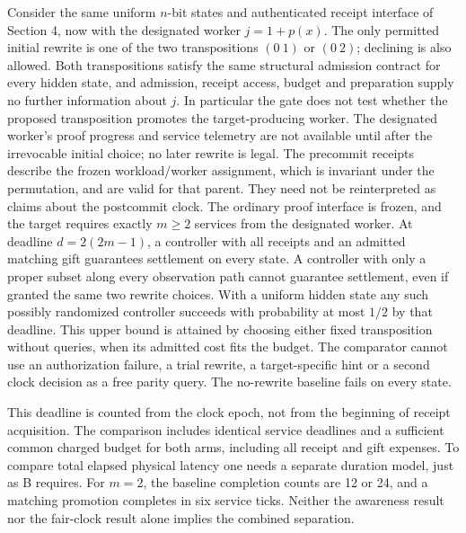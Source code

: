 \documentclass[11pt,letterpaper]{article}
\begin{document}
\begin{corollary}\label{cor:hidden}
Consider the same uniform $n$-bit states and authenticated receipt interface of Section 4, now with the designated worker $j=1+p(x)$. The only permitted initial rewrite is one of the two transpositions $(0\ 1)$ or $(0\ 2)$; declining is also allowed. Both transpositions satisfy the same structural admission contract for every hidden state, and admission, receipt access, budget and preparation supply no further information about $j$. In particular the gate does not test whether the proposed transposition promotes the target-producing worker. The designated worker's proof progress and service telemetry are not available until after the irrevocable initial choice; no later rewrite is legal. The precommit receipts describe the frozen workload/worker assignment, which is invariant under the permutation, and are valid for that parent. They need not be reinterpreted as claims about the postcommit clock. The ordinary proof interface is frozen, and the target requires exactly $m\ge2$ services from the designated worker. At deadline $d=2(2m-1)$, a controller with all receipts and an admitted matching gift guarantees settlement on every state. A controller with only a proper subset along every observation path cannot guarantee settlement, even if granted the same two rewrite choices. With a uniform hidden state any such possibly randomized controller succeeds with probability at most $1/2$ by that deadline. This upper bound is attained by choosing either fixed transposition without queries, when its admitted cost fits the budget. The comparator cannot use an authorization failure, a trial rewrite, a target-specific hint or a second clock decision as a free parity query. The no-rewrite baseline fails on every state.
\end{corollary}
This deadline is counted from the clock epoch, not from the beginning of receipt acquisition. The comparison includes identical service deadlines and a sufficient common charged budget for both arms, including all receipt and gift expenses. To compare total elapsed physical latency one needs a separate duration model, just as B requires. For $m=2$, the baseline completion counts are 12 or 24, and a matching promotion completes in six service ticks. Neither the awareness result nor the fair-clock result alone implies the combined separation.
\end{document}

